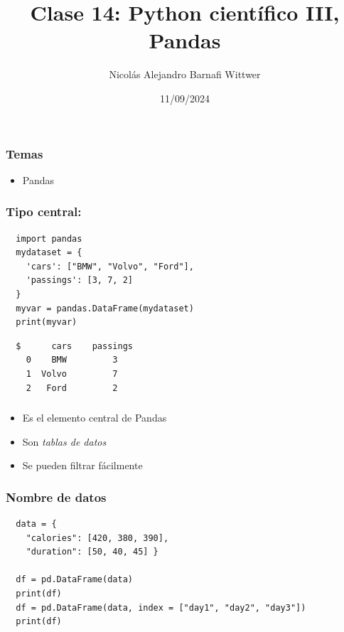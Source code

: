 \documentclass[14pt,aspectratio=169,xcolor=dvipsnames]{beamer}
\title[short title]{Clase 14: Python científico III, Pandas}
\subtitle{}
\author[NA Barnafi] {Nicolás Alejandro Barnafi Wittwer}
\institute[UC|CMM] 
{
    Pontificia Universidad Católica de Chile \\
    Centro de Modelamiento Matemático
}
\date{11/09/2024}
\begin{document}
\begin{frame}
    \maketitle
\end{frame}
\begin{frame}\frametitle{Temas}
    \begin{itemize}
        \item Pandas
    \end{itemize}

\end{frame}
\begin{frame}[fragile]\frametitle{Tipo central: }
    \begin{verbatim}
  import pandas
  mydataset = {
    'cars': ["BMW", "Volvo", "Ford"],
    'passings': [3, 7, 2]
  }
  myvar = pandas.DataFrame(mydataset)
  print(myvar) 
    \end{verbatim}

    \begin{verbatim}
  $      cars    passings
    0    BMW         3
    1  Volvo         7
    2   Ford         2
    \end{verbatim}
\end{frame}
\begin{frame}\frametitle{}
    \begin{itemize}
        \item Es el elemento central de Pandas
        \item Son \emph{tablas de datos}
        \item Se pueden filtrar fácilmente
    \end{itemize}
\end{frame}
\begin{frame}[fragile]\frametitle{Nombre de datos}

    \begin{verbatim}
  data = {
    "calories": [420, 380, 390],
    "duration": [50, 40, 45] }

  df = pd.DataFrame(data)
  print(df) 
  df = pd.DataFrame(data, index = ["day1", "day2", "day3"])
  print(df) 
    \end{verbatim}
\end{frame}
\end{document}
